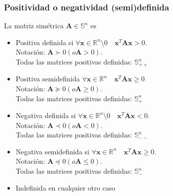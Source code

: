 \documentclass{beamer}
\begin{document}
\begin{frame}
\frametitle{Positividad o negatividad (semi)definida}
La matriz simétrica $\boldsymbol{A} \in \mathbb{S}^n$ es 
\begin{itemize}
\item Positiva definida si $ \forall \boldsymbol{x} \in \mathbb{R}^n  \setminus 0 \quad \boldsymbol{x}^T\boldsymbol{A}\boldsymbol{x}>0$. \\
Notación: $\boldsymbol{A}\succ 0 (o \boldsymbol{A}>0)$.\\
Todas las matrices positivas definidas: $\mathbb{S}^{n}_{++}$ 
\item Positiva semidefinida $ \forall \boldsymbol{x} \in \mathbb{R}^n  \quad \boldsymbol{x}^T\boldsymbol{A}\boldsymbol{x}\geq 0$\\
Notación: $\boldsymbol{A}\succeq 0 (o \boldsymbol{A}\geq 0)$.\\
Todas las matrices positivas definidas: $\mathbb{S}^{n}_{+}$ 
\item Negativa definida si $ \forall \boldsymbol{x} \in \mathbb{R}^n \setminus 0 \quad \boldsymbol{x}^T\boldsymbol{A}\boldsymbol{x}<0$.\\
Notación: $\boldsymbol{A}\prec 0 (o \boldsymbol{A}<0)$.\\
Todas las matrices positivas definidas: $\mathbb{S}^{n}_{--}$ 
\item Negativa semidefinida si $ \forall \boldsymbol{x} \in \mathbb{R}^n  \quad \boldsymbol{x}^T\boldsymbol{A}\boldsymbol{x}\geq 0$.\\
Notación: $\boldsymbol{A}\preceq 0 (o \boldsymbol{A}\leq 0)$.\\
Todas las matrices positivas definidas: $\mathbb{S}^{n}_{-}$ 
\item Indefinida en cualquier otro caso

\end{itemize}


\end{frame}
%
\end{document}
